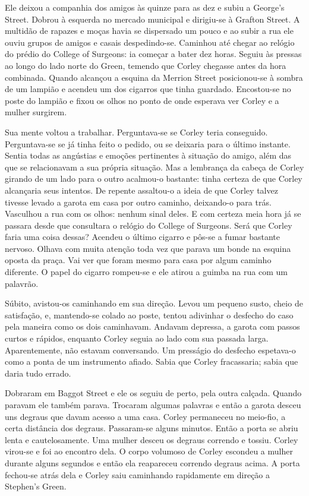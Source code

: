 Ele deixou a companhia dos amigos às quinze para as dez e subiu a George’s
Street.  Dobrou à esquerda no mercado municipal e dirigiu-se à Grafton Street.
A multidão de rapazes e moças havia se dispersado um pouco e ao subir a rua ele
ouviu grupos de amigos e casais despedindo-se.  Caminhou até chegar ao relógio
do prédio do College of Surgeons: ia começar a bater dez horas.  Seguiu às
pressas ao longo do lado norte do Green, temendo que Corley chegasse antes da
hora combinada.  Quando alcançou a esquina da Merrion Street posicionou-se à
sombra de um lampião e acendeu um dos cigarros que tinha guardado.  Encostou-se
no poste do lampião e fixou os olhos no ponto de onde esperava ver Corley e a
mulher surgirem.

Sua mente voltou a trabalhar.  Perguntava-se se Corley teria conseguido.
Perguntava-se se já tinha feito o pedido, ou se deixaria para o último
instante.  Sentia todas as angústias e emoções pertinentes à situação do amigo,
além das que se relacionavam a sua própria situação.  Mas a lembrança da cabeça
de Corley girando de um lado para o outro acalmou-o bastante: tinha certeza de
que Corley alcançaria seus intentos.  De repente assaltou-o a ideia de que
Corley talvez tivesse levado a garota em casa por outro caminho, deixando-o
para trás.  Vasculhou a rua com os olhos: nenhum sinal deles.  E com certeza
meia hora já se passara desde que consultara o relógio do College of Surgeons.
Será que Corley faria uma coisa dessas?  Acendeu o último cigarro e pôs-se a
fumar bastante nervoso.  Olhava com muita atenção toda vez que parava um bonde
na esquina oposta da praça.  Vai ver que foram mesmo para casa por algum
caminho diferente.  O papel do cigarro rompeu-se e ele atirou a guimba na rua
com um palavrão.

Súbito, avistou-os caminhando em sua direção.  Levou um pequeno susto, cheio de
satisfação, e, mantendo-se colado ao poste, tentou adivinhar o desfecho do caso
pela maneira como os dois caminhavam.  Andavam depressa, a garota com passos
curtos e rápidos, enquanto Corley seguia ao lado com sua passada larga.
Aparentemente, não estavam conversando.  Um presságio do desfecho espetava-o
como a ponta de um instrumento afiado.  Sabia que Corley fracassaria; sabia que
daria tudo errado.

Dobraram em Baggot Street e ele os seguiu de perto, pela outra calçada.  Quando
paravam ele também parava.  Trocaram algumas palavras e então a garota desceu
uns degraus que davam acesso a uma casa.  Corley permaneceu no meio-fio, a
certa distância dos degraus.  Passaram-se alguns minutos.  Então a porta se
abriu lenta e cautelosamente.  Uma mulher desceu os degraus correndo e tossiu.
Corley virou-se e foi ao encontro dela.  O corpo volumoso de Corley escondeu a
mulher durante alguns segundos e então ela reapareceu correndo degraus acima.
A porta fechou-se atrás dela e Corley saiu caminhando rapidamente em direção a
Stephen’s Green.

